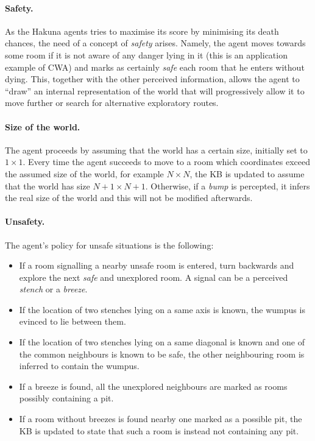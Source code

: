 \documentclass{llncs}
\begin{document}
\paragraph{Safety.} As the Hakuna agents tries to maximise its score by minimising its death chances, the need of a concept of \emph{safety} arises.
Namely, the agent moves towards some room if it is not aware of any danger lying in it (this is an application example of CWA) and marks as certainly \emph{safe} each room that he enters without dying.
This, together with the other perceived information, allows the agent to ``draw'' an internal representation of the world that will progressively allow it to move further or search for alternative exploratory routes.

\paragraph{Size of the world.} The agent proceeds by assuming that the world has a certain size, initially set to $1 \times 1$.
Every time the agent succeeds to move to a room which coordinates exceed the assumed size of the world, for example $N \times N$, the KB is updated to assume that the world has size $N+1 \times N+1$.
Otherwise, if a \emph{bump} is percepted, it infers the real size of the world and this will not be modified afterwards.

\paragraph{Unsafety.} The agent's policy for unsafe situations is the following:
\begin{itemize}
	\item If a room signalling a nearby unsafe room is entered, turn backwards and explore the next \emph{safe} and unexplored room. A signal can be a perceived \emph{stench} or a \emph{breeze}.
	\item If the location of two stenches lying on a same axis is known, the wumpus is evinced to lie between them.
	\item If the location of two stenches lying on a same diagonal is known and one of the common neighbours is known to be safe, the other neighbouring room is inferred to contain the wumpus.
	\item If a breeze is found, all the unexplored neighbours are marked as rooms possibly containing a pit.
	\item If a room without breezes is found nearby one marked as a possible pit, the KB is updated to state that such a room is instead not containing any pit. 
\end{itemize}
\end{document}
